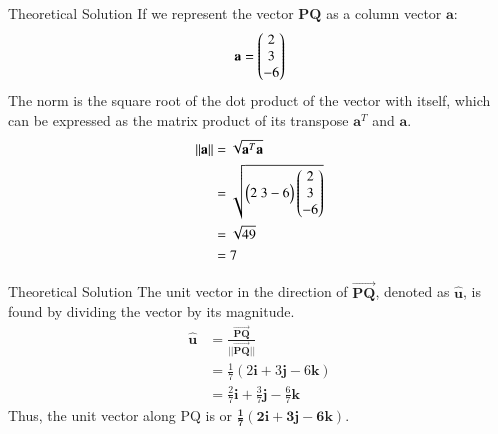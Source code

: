 \documentclass{beamer}
\begin{document}
\begin{frame}{Theoretical Solution}
If we represent the vector \(\mathbf{PQ}\) as a column vector \(\mathbf{a}\):
\[
\mathbf{a} = 
\begin{pmatrix}2\\3\\-6\end{pmatrix}
\]
The norm is the square root of the dot product of the vector with itself, which can be expressed as the matrix product of its transpose \(\mathbf{a}^T\) and \(\mathbf{a}\).
\begin{align}
    \left\| \mathbf{a} \right\| &= \sqrt{\mathbf{a}^T \mathbf{a}} \\
    &= \sqrt{
        \begin{pmatrix}2\ 3-6\end{pmatrix}
        \begin{pmatrix}2\\3\\-6\end{pmatrix}
    } \\
    &= \sqrt{49} \\
    &= 7
\end{align}
\end{frame}
\begin{frame}{Theoretical Solution}
The unit vector in the direction of $\vec{\mathbf{PQ}}$, denoted as $\mathbf{\hat{u}}$, is found by dividing the vector by its magnitude.
\begin{align}
    \mathbf{\hat{u}} &= \frac{\vec{\mathbf{PQ}}}{||\vec{\mathbf{PQ}}||} \\
    &= \frac{1}{7}(2\mathbf{i} + 3\mathbf{j} - 6\mathbf{k}) \\
    &= \frac{2}{7}\mathbf{i} + \frac{3}{7}\mathbf{j} - \frac{6}{7}\mathbf{k}
\end{align}
Thus, the unit vector along PQ is  or $\mathbf{\frac{1}{7}(2\mathbf{i} + 3\mathbf{j} - 6\mathbf{k})}$.
\end{frame}
\end{document}
